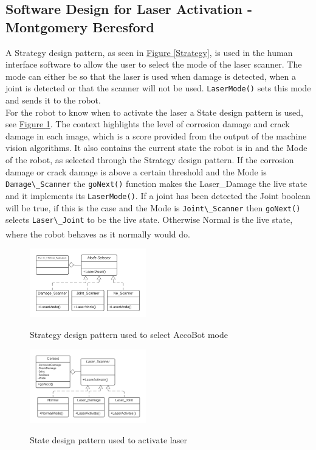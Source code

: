 \documentclass[11pt]{article}		%
\newcommand{\supercite}[1]{\textsuperscript{\cite{#1}}}		%
\newcommand{\figref}[1]{\hyperref[#1]{Figure \ref*{#1}}}    %
\begin{document}
	        
	        \subsection[Software Design for Laser Activation]{Software Design for Laser Activation - Montgomery Beresford}
	        
	        A Strategy design pattern, as seen in \figref{Strategy}, is used in the human interface software to allow the user to select the mode of the laser scanner. The mode can either be so that the laser is used when damage is detected, when a joint is detected or that the scanner will not be used. \verb|LaserMode()| sets this mode and sends it to the robot.	        \\
	        For the robot to know when to activate the laser a State design pattern is used, see \figref{State}. The context highlights the level of corrosion damage and crack damage in each image, which is a score provided from the output of the machine vision algorithms. It also contains the current state the robot is in and the Mode of the robot, as selected through the Strategy design pattern. If the corrosion damage or crack damage is above a certain threshold and the Mode is  \verb|Damage\_Scanner| the \verb|goNext()| function makes the Laser\_Damage the live state and it implements its \verb|LaserMode()|. If a joint has been detected the Joint boolean will be true, if this is the case and the Mode is \verb|Joint\_Scanner| then \verb|goNext()| selects \verb|Laser\_Joint| to be the live state. Otherwise Normal is the live state, where the robot behaves as it normally would do. \supercite{Design_Patterns}
	        
	        	\begin{figure}[h]
				\centering
					\begin{multicols}{2}
					\includegraphics[width=0.45\textwidth]{Strategy_3YP_UML}
					\caption{Strategy design pattern used to select AccoBot mode}
					\label{Strategy}
			    	\columnbreak
					\includegraphics[width=0.45\textwidth]{State}
					\caption{State design pattern used to activate laser}
					\label{State}
					\end{multicols}
			\end{figure}	
			
\end{document}

